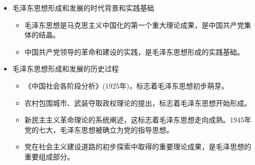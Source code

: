 \begin{itemize}
	\item 毛泽东思想形成和发展的时代背景和实践基础\\
	\begin{itemize}
		\item 毛泽东思想是马克思主义中国化的第一个重大理论成果，是中国共产党集体的结晶。
		\item 中国共产党领导的革命和建设的实践，是毛泽东思想形成的实践基础。
	\end{itemize}
	\item 毛泽东思想形成和发展的历史过程
	\begin{itemize}
		\item 《中国社会各阶段分析》(1925年)，标志着毛泽东思想初步萌芽。
		\item 农村包围城市、武装夺取政权理论的提出，标志着毛泽东思想开始形成。
		\item 新民主主义革命理论的系统阐述，这标志着毛泽东思想走向成熟。1945年党的七大，毛泽东思想被确立为党的指导思想。
		\item 党在社会主义建设道路的初步探索中取得的重要理论成果，是毛泽思想的重要组成部分。
	\end{itemize}
\end{itemize}
